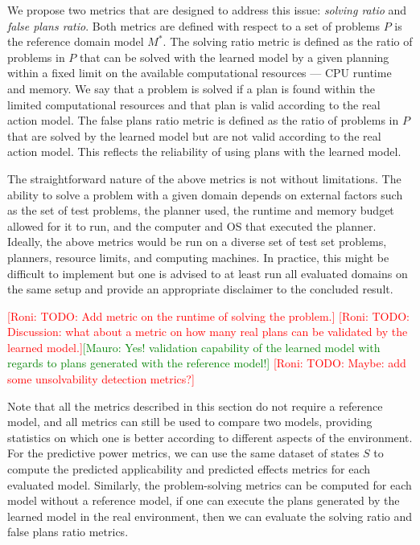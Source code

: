 \documentclass{article}
\theoremstyle{definition}
\theoremstyle{remark}
\newcommand{\realm}{\ensuremath{M^*}\xspace}
\newcommand{\roni}[1]{{\textcolor{red}{[Roni: #1]}}}
\newcommand{\mauro}[1]{{\textcolor{green}{[Mauro: #1]}}}
\begin{document}
We propose two metrics that are designed to address this issue: \emph{solving ratio} and \emph{false plans ratio}. 
Both metrics are defined with respect to a set of problems $P$ is the reference domain model $\realm$. 
The solving ratio metric is defined as the ratio of problems in $P$ that can be solved with the learned model by a given planning within a fixed limit on the available computational resources --- CPU runtime and memory. 
We say that a problem is solved if a plan is found within the limited computational resources and that plan is valid according to the real action model. 
The false plans ratio metric is defined as the ratio of problems in $P$ that are solved by the learned model but are not valid according to the real action model. This reflects the reliability of using plans with the learned model.

The straightforward nature of the above metrics is not without limitations. The ability to solve a problem with a given domain depends on external factors such as the set of test problems, the planner used, the runtime and memory budget allowed for it to run, and the computer and OS that executed the planner. Ideally, the above metrics would be run on a diverse set of test set problems, planners, resource limits, and computing machines. In practice, this might be difficult to implement but one is advised to at least run all evaluated domains on the same setup and provide an appropriate disclaimer to the concluded result. 

\roni{TODO: Add metric on the runtime of solving the problem.}
\roni{TODO: Discussion: what about a metric on how many real plans can be validated by the learned model.}\mauro{Yes! validation capability of the learned model with regards to plans generated with the reference model!}
\roni{TODO: Maybe: add some unsolvability detection metrics?}





Note that all the metrics described in this section do not require a reference model, and all metrics 
can still be used to compare two models,  providing statistics on which one is better according to different aspects of the environment. 
For the predictive power metrics, we can use the same dataset of states $S$ to compute the predicted applicability and predicted effects metrics for each evaluated model. Similarly, the problem-solving metrics can be computed for each model without a reference model, if one can execute the plans generated by the learned model in the real environment, then we can evaluate the solving ratio and false plans ratio metrics. 
\end{document}
